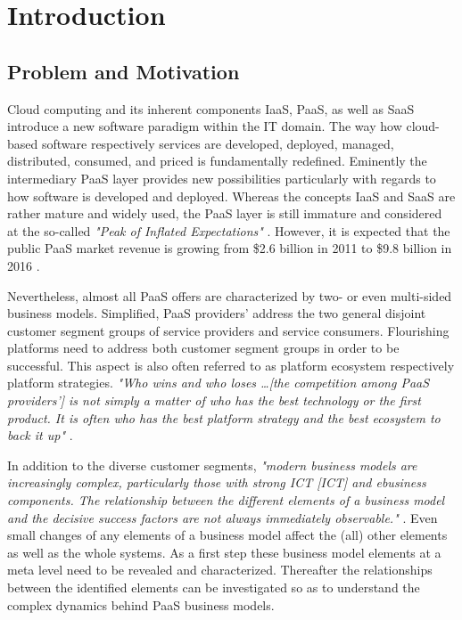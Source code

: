 \chapter{Introduction}\label{ch:intro}

\section{Problem and Motivation}\label{ch:intro:mo}

Cloud computing and its inherent components \acf{IaaS}, \acf{PaaS}, as well as \acf{SaaS} introduce a new software paradigm within the \acf{IT} domain. The way how cloud-based software respectively services are developed, deployed, managed, distributed, consumed, and priced is fundamentally redefined. Eminently the intermediary \ac{PaaS} layer provides new possibilities particularly with regards to how software is developed and deployed. Whereas the concepts \ac{IaaS} and \ac{SaaS} are rather mature and widely used, the \ac{PaaS} layer is still immature and considered at the so-called \textit{"Peak of Inflated Expectations"} \citep[p. 5]{Smith2012}. However, it is expected that the public \ac{PaaS} market revenue is growing from \$2.6 billion in 2011 to \$9.8 billion in 2016 \citep[p. 22]{Hendrick2012a}.

Nevertheless, almost all \ac{PaaS} offers are characterized by two- or even multi-sided business models. Simplified, \ac{PaaS} providers' address the two general disjoint customer segment groups of service providers and service consumers. Flourishing platforms need to address both customer segment groups in order to be successful. This aspect is also often referred to as platform ecosystem respectively platform strategies. \textit{"Who wins and who loses \ldots [the competition among \ac{PaaS} providers'] is not simply a matter of who has the best technology or the first product. It is often who has the best platform strategy and the best ecosystem to back it up"} \citep[p. 34]{Cusumano2010}.

In addition to the diverse customer segments, \textit{"modern business models are increasingly complex, particularly those with strong ICT [\acl{ICT}] and ebusiness components. The relationship between the different elements of a business model and the decisive success factors are not always immediately observable."} \citep[p. 14]{Osterwalder2005}. Even small changes of any elements of a business model affect the (all) other elements as well as the whole systems. As a first step these business model elements at a meta level need to be revealed and characterized. Thereafter the relationships between the identified elements can be investigated so as to understand the complex dynamics behind \ac{PaaS} business models.


